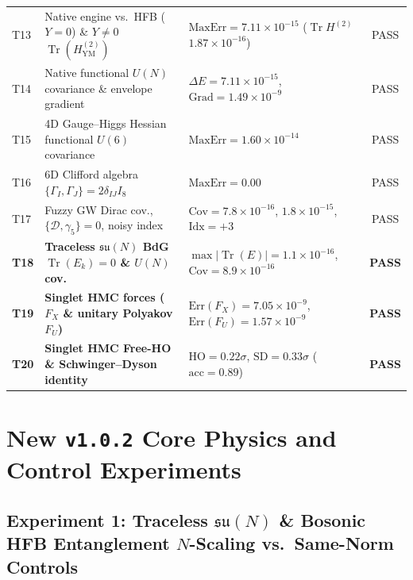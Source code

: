 \documentclass[11pt,a4paper]{article}
\DeclareMathOperator{\Tr}{Tr}
\begin{document}
\begin{table}[H]
{\begin{tabular}{@{}lllc@{}}
    T13 & Native engine vs.\ HFB ($Y=0$) \& $Y\neq 0$ $\Tr(H^{(2)}_{\mathrm{YM}})$ & $\mathrm{MaxErr} = 7.11 \times 10^{-15}$ ($\Tr H^{(2)}$ $1.87\times 10^{-16}$) & PASS \\
    T14 & Native functional $U(N)$ covariance \& envelope gradient & $\Delta E = 7.11 \times 10^{-15}$, $\mathrm{Grad} = 1.49 \times 10^{-9}$ & PASS \\
    T15 & 4D Gauge--Higgs Hessian functional $U(6)$ covariance & $\mathrm{MaxErr} = 1.60 \times 10^{-14}$ & PASS \\
    T16 & 6D Clifford algebra $\{\Gamma_I, \Gamma_J\} = 2\delta_{IJ} I_8$ & $\mathrm{MaxErr} = 0.00$ & PASS \\
    T17 & Fuzzy GW Dirac cov., $\{\mathcal{D},\gamma_5\}=0$, noisy index & $\mathrm{Cov}=7.8\times 10^{-16}$, $1.8\times 10^{-15}$, $\mathrm{Idx}=+3$ & PASS \\
    \midrule
    \textbf{T18} & \textbf{Traceless $\mathfrak{su}(N)$ BdG $\Tr(E_k)=0$ \& $U(N)$ cov.} & $\max|\Tr(E)| = 1.1\times 10^{-16}$, $\mathrm{Cov} = 8.9\times 10^{-16}$ & \textbf{PASS} \\
    \textbf{T19} & \textbf{Singlet HMC forces ($F_X$ \& unitary Polyakov $F_U$)} & $\mathrm{Err}(F_X) = 7.05\times 10^{-9}$, $\mathrm{Err}(F_U) = 1.57\times 10^{-9}$ & \textbf{PASS} \\
    \textbf{T20} & \textbf{Singlet HMC Free-HO \& Schwinger--Dyson identity} & $\mathrm{HO} = 0.22\sigma$, $\mathrm{SD} = 0.33\sigma$ ($\mathrm{acc}=0.89$) & \textbf{PASS} \\
    \bottomrule
  \end{tabular}%
  }
\end{table}

\section{New \texttt{v1.0.2} Core Physics and Control Experiments}
\label{sec:v102_results}

\subsection{Experiment 1: Traceless $\mathfrak{su}(N)$ \& Bosonic HFB Entanglement $N$-Scaling vs.\ Same-Norm Controls}
\label{sec:exp1}
\end{document}
